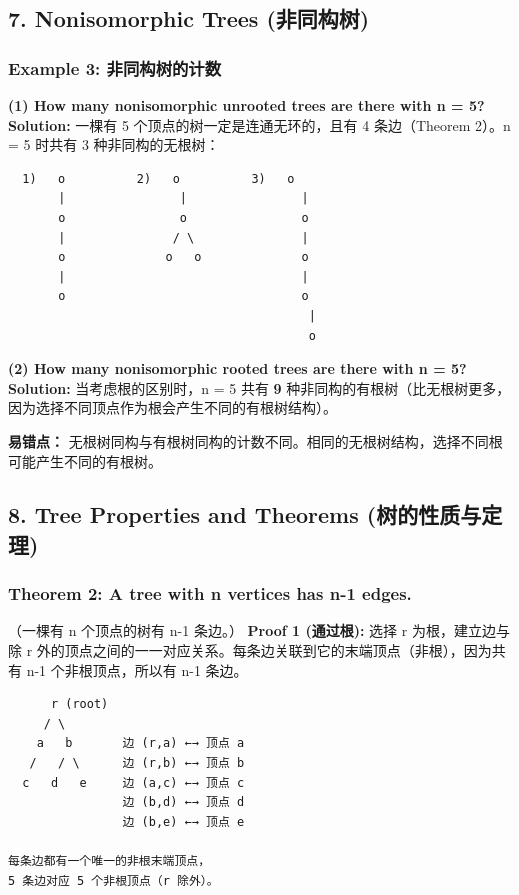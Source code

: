 \documentclass[10pt,a4paper,openany]{ctexbook}
\theoremstyle{definition}
\theoremstyle{remark}
\renewenvironment{quote}
  {\list{}{\leftmargin=1em\rightmargin=0pt\topsep=0.5pt\partopsep=0pt}\item[]}
  {\endlist}
\begin{document}
\vspace{-2pt}

\subsection{7. Nonisomorphic Trees (非同构树)}

\subsubsection{Example 3: 非同构树的计数}

\textbf{(1) How many nonisomorphic unrooted trees are there with n = 5?}
\textbf{Solution:} 一棵有 5 个顶点的树一定是连通无环的，且有 4 条边（Theorem 2）。n = 5 时共有 3 种非同构的无根树：
{\footnotesize\begin{verbatim}
  1)   o          2)   o          3)   o
       |                |                |
       o                o                o
       |               / \               |
       o              o   o              o
       |                                 |
       o                                 o
                                          |
                                          o
\end{verbatim}}

\textbf{(2) How many nonisomorphic rooted trees are there with n = 5?}
\textbf{Solution:} 当考虑根的区别时，n = 5 共有 \textbf{9} 种非同构的有根树（比无根树更多，因为选择不同顶点作为根会产生不同的有根树结构）。
\begin{quote}
\textbf{易错点：} 无根树同构与有根树同构的计数不同。相同的无根树结构，选择不同根可能产生不同的有根树。

\end{quote}
\vspace{-2pt}

\subsection{8. Tree Properties and Theorems (树的性质与定理)}

\subsubsection{Theorem 2: A tree with n vertices has n-1 edges.}

（一棵有 n 个顶点的树有 n-1 条边。）
\textbf{Proof 1 (通过根):} 选择 r 为根，建立边与除 r 外的顶点之间的一一对应关系。每条边关联到它的末端顶点（非根），因为共有 n-1 个非根顶点，所以有 n-1 条边。
{\footnotesize\begin{verbatim}
      r (root)
     / \
    a   b       边 (r,a) ←→ 顶点 a
   /   / \      边 (r,b) ←→ 顶点 b
  c   d   e     边 (a,c) ←→ 顶点 c
                边 (b,d) ←→ 顶点 d
                边 (b,e) ←→ 顶点 e

每条边都有一个唯一的非根末端顶点，
5 条边对应 5 个非根顶点（r 除外）。
\end{verbatim}}
\end{document}
